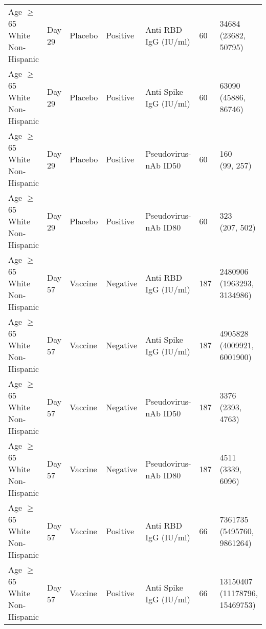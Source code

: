 \documentclass[]{book}
\theoremstyle{definition}
\theoremstyle{definition}
\theoremstyle{definition}
\newcommand{\1}{\mathbbm{1}}
\begin{document}
\begin{landscape}
\begin{ThreePartTable}
\begin{longtable}[t]{>{\raggedright\arraybackslash}p{7cm}llllll}
\hspace{1em}Age $\geq$ 65 White Non-Hispanic & Day 29 & Placebo & Positive & Anti RBD IgG (IU/ml) & 60 & \makecell[l]{34684\\(23682, 50795)}\\
\hspace{1em}Age $\geq$ 65 White Non-Hispanic & Day 29 & Placebo & Positive & Anti Spike IgG (IU/ml) & 60 & \makecell[l]{63090\\(45886, 86746)}\\
\hspace{1em}Age $\geq$ 65 White Non-Hispanic & Day 29 & Placebo & Positive & Pseudovirus-nAb ID50 & 60 & \makecell[l]{160\\(99, 257)}\\
\hspace{1em}Age $\geq$ 65 White Non-Hispanic & Day 29 & Placebo & Positive & Pseudovirus-nAb ID80 & 60 & \makecell[l]{323\\(207, 502)}\\
\hspace{1em}Age $\geq$ 65 White Non-Hispanic & Day 57 & Vaccine & Negative & Anti RBD IgG (IU/ml) & 187 & \makecell[l]{2480906\\(1963293, 3134986)}\\
\hspace{1em}Age $\geq$ 65 White Non-Hispanic & Day 57 & Vaccine & Negative & Anti Spike IgG (IU/ml) & 187 & \makecell[l]{4905828\\(4009921, 6001900)}\\
\hspace{1em}Age $\geq$ 65 White Non-Hispanic & Day 57 & Vaccine & Negative & Pseudovirus-nAb ID50 & 187 & \makecell[l]{3376\\(2393, 4763)}\\
\hspace{1em}Age $\geq$ 65 White Non-Hispanic & Day 57 & Vaccine & Negative & Pseudovirus-nAb ID80 & 187 & \makecell[l]{4511\\(3339, 6096)}\\
\hspace{1em}Age $\geq$ 65 White Non-Hispanic & Day 57 & Vaccine & Positive & Anti RBD IgG (IU/ml) & 66 & \makecell[l]{7361735\\(5495760, 9861264)}\\
\hspace{1em}Age $\geq$ 65 White Non-Hispanic & Day 57 & Vaccine & Positive & Anti Spike IgG (IU/ml) & 66 & \makecell[l]{13150407\\(11178796, 15469753)}\\

\end{longtable}
\end{ThreePartTable}
\end{landscape}
\end{document}
